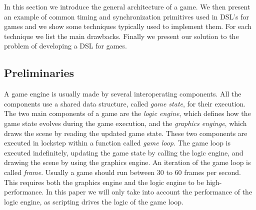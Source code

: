 In this section we introduce the general architecture of a game. We then present an example of common timing and synchronization primitives used in DSL's for games and we show some techniques typically used to implement them. For each technique we list the main drawbacks. Finally we present our solution to the problem of developing a DSL for games.

\subsection{Preliminaries}
A game engine is usually made by several interoperating components. All the components use a shared data structure, called \textit{game state}, for their execution. The two main components of a game are the \textit{logic engine}, which defines how the game state evolves during the game execution, and the \textit{graphics enginge}, which draws the scene by reading the updated game state. These two components are executed in lockstep within a function called \textit{game loop}. The game loop is executed indefinitely, updating the game state by calling the logic engine, and drawing the scene by using the graphics engine. An iteration of the game loop is called \textit{frame}. Usually a game should run between 30 to 60 frames per second. This requires both the graphics engine and the logic engine to be high-performance. In this paper we will only take into account the performance of the logic engine, as scripting drives the logic of the game loop.

